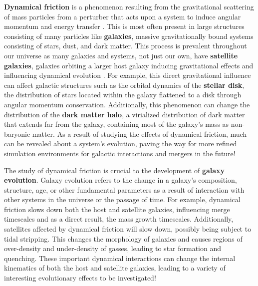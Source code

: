 \documentclass[fleqn,usenatbib]{mnras}
\begin{document}
\hspace{\parindent} \textbf{Dynamical friction} is a phenomenon resulting from the gravitational scattering of mass particles from a perturber that acts upon a system to induce angular momentum and energy transfer \citep{Binney_Tremaine-2008}. This is most often present in large structures consisting of many particles like \textbf{galaxies}, massive gravitationally bound systems consisting of stars, dust, and dark matter. This process is prevalent throughout our universe as many galaxies and systems, not just our own, have \textbf{satellite galaxies}, galaxies orbiting a larger host galaxy inducing gravitational effects and influencing dynamical evolution \citep{Binney_Tremaine-2008}. For example, this direct gravitational influence can affect galactic structures such as the orbital dynamics of the \textbf{stellar disk}, the distribution of stars located within the galaxy flattened to a disk through angular momentum conservation. Additionally, this phenomenon can change the distribution of the \textbf{dark matter halo}, a virialized distribution of dark matter that extends far from the galaxy, containing most of the galaxy's mass as non-baryonic matter. As a result of studying the effects of dynamical friction, much can be revealed about a system's evolution, paving the way for more refined simulation environments for galactic interactions and mergers in the future!

\vspace{10pt}

\hspace{\parindent} The study of dynamical friction is crucial to the development of \textbf{galaxy evolution}. Galaxy evolution refers to the change in a galaxy's composition, structure, age, or other fundamental parameters as a result of interaction with other systems in the universe or the passage of time. For example, dynamical friction slows down both the host and satellite galaxies, influencing merge timescales and as a direct result, the mass growth timescales. Additionally, satellites affected by dynamical friction will slow down, possibly being subject to tidal stripping. This changes the morphology of galaxies and causes regions of over-density and under-density of gasses, leading to star formation and quenching. These important dynamical interactions can change the internal kinematics of both the host and satellite galaxies, leading to a variety of interesting evolutionary effects to be investigated!

\vspace{10pt}
\end{document}
